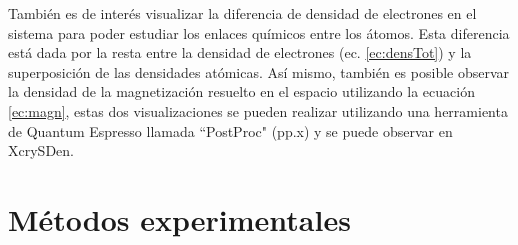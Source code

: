   \newline
  \par Tambi\'en es de inter\'es visualizar la diferencia de densidad de electrones en el sistema para poder estudiar los enlaces qu\'imicos entre los \'atomos. Esta diferencia est\'a dada por la resta entre la densidad de electrones (ec. \ref{ec:densTot}) y la superposici\'on de las densidades at\'omicas.  As\'i mismo, tambi\'en es posible observar la densidad de la magnetizaci\'on resuelto en el espacio utilizando la ecuaci\'on \ref{ec:magn}, estas dos visualizaciones se pueden realizar utilizando una herramienta de Quantum Espresso llamada ``PostProc" (pp.x) y se puede observar en XcrySDen.
  
\section{M\'etodos experimentales} \label{Met:secmetExp}
